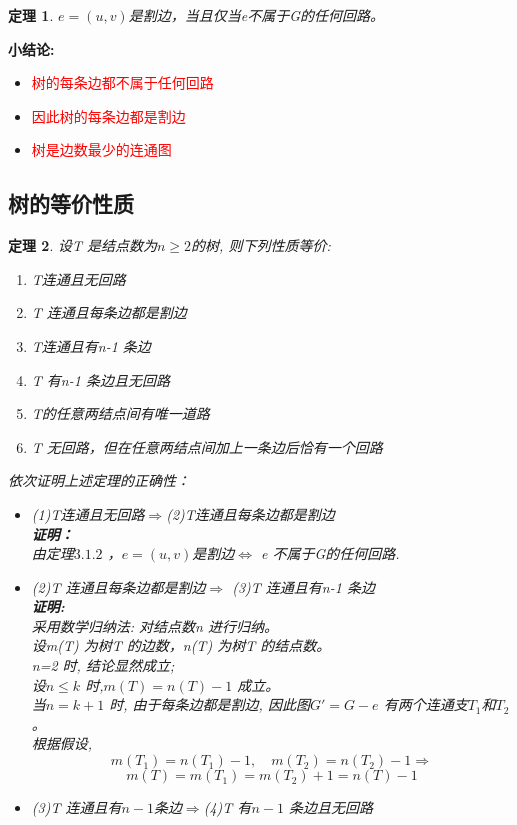 \documentclass[11pt,a4paper,openany]{book}
\newcommand{\hwxw}{\CJKfamily{hwxw}}
\newcommand{\song}{\CJKfamily{song}}
\newtheorem{theorem}{\textbf{定理}}[section]
\begin{document}
\begin{theorem}
$e=(u,v)$是割边，当且仅当e不属于G的任何回路。\\
\end{theorem}
\textbf{小结论:}
\begin{itemize}
  \item \textcolor{red}{树的每条边都不属于任何回路}
  \item \textcolor{red}{因此树的每条边都是割边}
  \item \textcolor{red}{树是边数最少的连通图}
\end{itemize}
\subsection{树的等价性质}
\begin{theorem}
设T 是结点数为$n\geq2 $的树, 则下列性质等价:
\begin{enumerate}
  \item T连通且无回路
  \item T 连通且每条边都是割边
  \item T连通且有n-1 条边
  \item T 有n-1 条边且无回路
  \item T的任意两结点间有唯一道路
  \item T 无回路，但在任意两结点间加上一条边后恰有一个回路
\end{enumerate}
{\hwxw 依次证明上述定理的正确性：}
{\song
\begin{itemize}
  \item (1)T连通且无回路$\Rightarrow$(2)T连通且每条边都是割边\\
  \textbf{证明：}\\
  由定理$3.1.2$ ，$e=(u,v)$是割边$\Leftrightarrow$ e 不属于G的任何回路.
  \item (2)T 连通且每条边都是割边$\Rightarrow$ (3)T 连通且有n-1 条边\\
  \textbf{证明:}\\
  采用数学归纳法: 对结点数n 进行归纳。\\
  设m(T) 为树T 的边数，n(T) 为树T 的结点数。\\
  n=2 时, 结论显然成立;\\
  设$n\leq k$ 时,$m(T)=n(T)-1$ 成立。\\
  当$n=k+1$ 时, 由于每条边都是割边, 因此图$G'=G - e$ 有两个连通支$T_1$和$T_2$。\\
  根据假设,$$ m(T_1)=n(T_1)-1,\quad m(T_2)=n(T_2)-1 \Rightarrow $$ $$m(T)=m(T_1)=m(T_2)+1=n(T)-1$$
  \item (3)T 连通且有$n-1$条边$\Rightarrow$(4)T 有$n-1$ 条边且无回路 \\

\end{itemize}}
\end{theorem}
\end{document}
